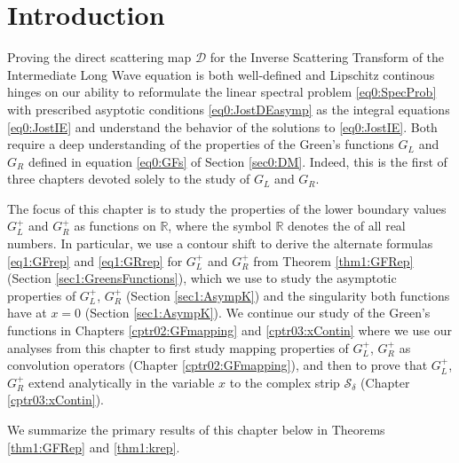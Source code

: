 \documentclass[../dissertation.tex]{subfiles}
\begin{document}
\section{Introduction}\label{sec1:Intro}

Proving the direct scattering map $\mathscr D$ for the Inverse Scattering Transform
of the Intermediate Long Wave equation is both well-defined and Lipschitz 
continous hinges on our ability to reformulate the linear spectral problem 
\eqref{eq0:SpecProb} with prescribed asyptotic conditions \eqref{eq0:JostDEasymp}
as the integral equations \eqref{eq0:JostIE} and understand the behavior of 
the solutions to \eqref{eq0:JostIE}. Both require a deep understanding of
the properties of the Green's functions $G_L$ and $G_R$ defined in equation
\eqref{eq0:GFs} of Section \ref{sec0:DM}. Indeed, this is the first of three
chapters devoted solely to the study of $G_L$ and $G_R$.


The focus of this chapter is to study the properties 
of the lower boundary values $G_L^+$ and $G_R^+$ as functions on $\mathbb R$, 
where the symbol $\mathbb R$ denotes the of all real numbers.\label{sym:Reals}
In particular, we use a contour shift to derive the alternate formulas
\eqref{eq1:GFrep} and \eqref{eq1:GRrep} for $G_L^+$ and $G_R^+$ from 
Theorem \ref{thm1:GFRep} (Section \ref{sec1:GreensFunctions}), which
we use to study the asymptotic properties of $G_L^+$, 
$G_R^+$ (Section \ref{sec1:AsympK}) and the singularity both functions have 
at $x=0$ (Section \ref{sec1:AsympK}). We continue our study of the Green's
functions in Chapters \ref{cptr02:GFmapping} and \ref{cptr03:xContin} 
where we use our analyses from this chapter 
to first study mapping properties of $G_L^+$, $G_R^+$ as convolution operators 
(Chapter \ref{cptr02:GFmapping}), and then to prove that $G_L^+$, $G_R^+$
extend analytically in the variable $x$ to the complex strip $\mathcal S_\delta$
(Chapter \ref{cptr03:xContin}).

We summarize the primary results of this chapter below in Theorems
\ref{thm1:GFRep} and \ref{thm1:krep}.
\end{document}
